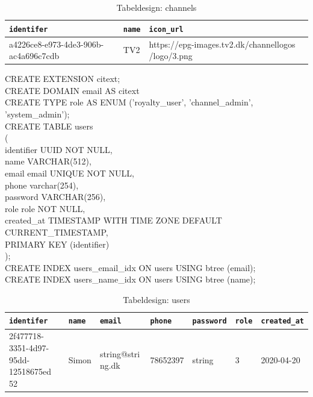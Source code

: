 \begin{table}[ht]
    \begin{tabularx}{\textwidth}{|X|X|X|}
        \hline
        \texttt{\textbf{identifer}} &  \texttt{\textbf{name}} & \texttt{\textbf{icon\_url}}\\
        \hline
        a4226ce8-e973-4de3-906b-ac4a696c7cdb & TV2 & https://epg-images.tv2.dk/channellogos /logo/3.png \\
        \hline
    \end{tabularx}
    \caption{Tabeldesign: channels}
    \label{tab:channel_table}
\end{table}



\noindent
CREATE EXTENSION citext;\\
CREATE DOMAIN email AS citext\\
CREATE TYPE role AS ENUM ('royalty\_user', 'channel\_admin', 'system\_admin');\\
CREATE TABLE users\\
(\\
    identifier UUID         NOT NULL,\\
    name       VARCHAR(512),\\
    email      email UNIQUE NOT NULL,\\
    phone      varchar(254),\\
    password   VARCHAR(256),\\
    role       role         NOT NULL,\\
    created\_at TIMESTAMP WITH TIME ZONE DEFAULT CURRENT\_TIMESTAMP,\\
    PRIMARY KEY (identifier)\\
);\\
CREATE INDEX users\_email\_idx ON users USING btree (email);\\
CREATE INDEX users\_name\_idx ON users USING btree (name);\\


\begin{table}[ht]
    \begin{tabularx}{\textwidth}{|X|X|X|X|X|X|X|}
        \hline
        \texttt{\textbf{identifer}} &  \texttt{\textbf{name}} & \texttt{\textbf{email}} & \texttt{\textbf{phone}} & \texttt{\textbf{password}} & \texttt{\textbf{role}} & \texttt{\textbf{created\_at}}\\
        \hline
        2f477718-3351-4d97-95dd-12518675ed 52 & Simon & string@stri ng.dk & 78652397 & string & 3 & 2020-04-20\\
        \hline
    \end{tabularx}
    \caption{Tabeldesign: users}
    \label{tab:users_table}
\end{table}


